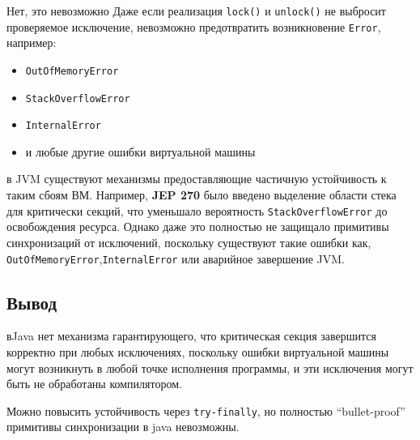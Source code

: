 \documentclass[a4paper,12pt]{article}
\begin{document}
Нет, это невозможно
Даже если реализация \texttt{lock()} и \texttt{unlock()} не выбросит проверяемое исключение,
 невозможно предотвратить возникновение \texttt{Error}, например:

\begin{itemize}
    \item \texttt{OutOfMemoryError}
    \item \texttt{StackOverflowError}
    \item \texttt{InternalError}
    \item и любые другие ошибки виртуальной машины
\end{itemize}

в JVM существуют механизмы предоставляющие частичную устойчивость к таким сбоям ВМ. Например,
\textbf{JEP 270} было введено выделение области стека для критически секций, что уменьшало
вероятность \texttt{StackOverflowError}  до освобождения ресурса.
Однако даже это полностью не защищало примитивы синхронизаций от исключений,
поскольку существуют такие ошибки как, \texttt{OutOfMemoryError},\texttt{InternalError} или аварийное завершение JVM.

\subsection*{Вывод}

вJava нет  механизма гарантирующего, что критическая секция завершится корректно при любых
исключениях, поскольку ошибки виртуальной машины могут возникнуть в любой точке исполнения программы,
и эти исключения могут быть не обработаны компилятором.

Можно повысить устойчивость через \texttt{try-finally}, но полностью ``bullet-proof'' примитивы
синхронизации в java невозможны.
\end{document}
